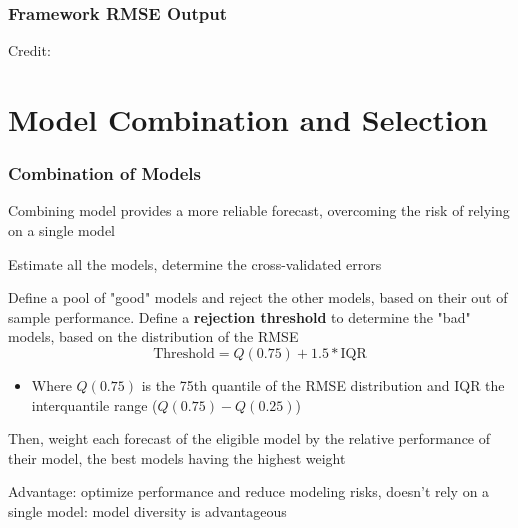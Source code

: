 \documentclass{beamer}
\newenvironment{wideitemize}{\itemize\addtolength{\itemsep}{10pt}}{\enditemize}
\begin{document}
    \begin{frame}
      \frametitle{Framework RMSE Output}
  \hspace*{15pt}\hbox{\scriptsize Credit:}      
    \end{frame}
  
    
\section{Model Combination and Selection}

\begin{frame}
  \frametitle{Combination of Models}

  \begin{wideitemize}
    \item Combining model provides a more reliable forecast, overcoming the risk of relying on a single model
    \item Estimate all the models, determine the cross-validated errors
    \item Define a pool of "good" models and reject the other models, based on their out of sample performance. Define a \textbf{rejection threshold} to determine the "bad" models, based on the distribution of the RMSE
      \begin{equation*}
        \text{Threshold} = Q(0.75) + 1.5*\text{IQR}
      \end{equation*}
      \begin{itemize}
      \item Where $Q(0.75)$ is the 75th quantile of the RMSE distribution and IQR the interquantile range ($Q(0.75) - Q(0.25)$)
      \end{itemize}
    \item Then, weight each forecast of the eligible model by the relative performance of their model, the best models having the highest weight
    \item Advantage: optimize performance and reduce modeling risks, doesn’t rely on a single model: model diversity is advantageous    
  \end{wideitemize}
  
\end{frame}
\end{document}
